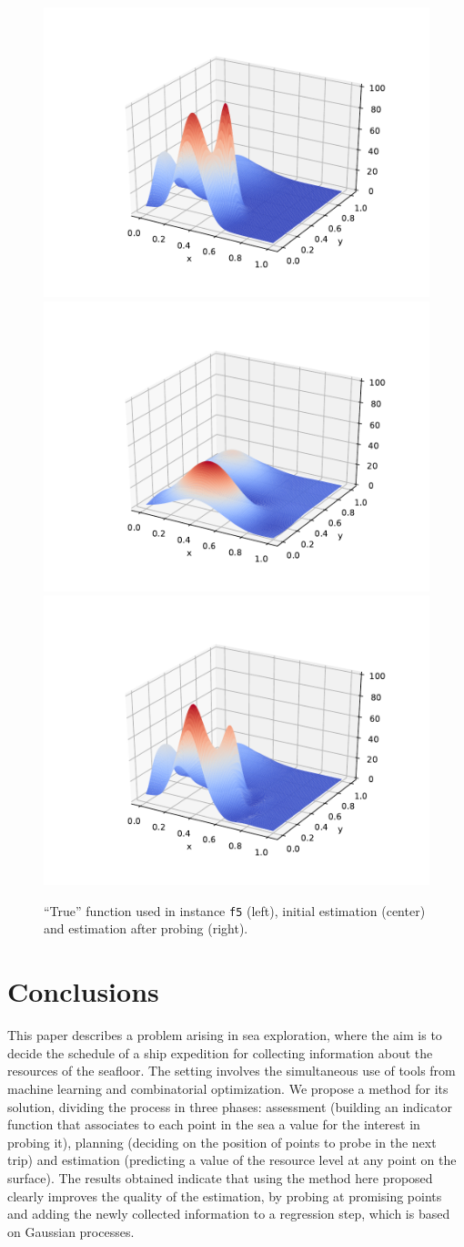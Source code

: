 \documentclass[smallextended]{svjour3}
\begin{document}
\begin{figure}[h!tbp]
  \centering
  \includegraphics[width=.32\textwidth,trim=100 30 50 50,clip=True]{f5-16-true.pdf}
  \includegraphics[width=.32\textwidth,trim=100 30 50 50,clip=True]{f5-16-prev.pdf}
  \includegraphics[width=.32\textwidth,trim=100 30 50 50,clip=True]{f5-16-post.pdf}
  \caption{``True'' function used in instance \texttt{f5} (left), initial estimation (center) and estimation after probing (right).}
  \label{fig:f5}
\end{figure}


\section{Conclusions}
\label{sec:conclusions}

This paper describes a problem arising in sea exploration, where the aim is to decide the schedule of a ship expedition for collecting information about the resources of the seafloor.  The setting involves the simultaneous use of tools from machine learning and combinatorial optimization.   We propose a method for its solution, dividing the process in three phases: assessment (building an indicator function that associates to each point in the sea a value for the interest in probing it),
planning (deciding on the position of points to probe in the next trip) and estimation (predicting a value of the resource level at any point on the surface).  The results obtained indicate that using the method here proposed clearly improves the quality of the estimation, by probing at promising points and adding the newly collected information to a regression step, which is based on Gaussian processes.
\end{document}
